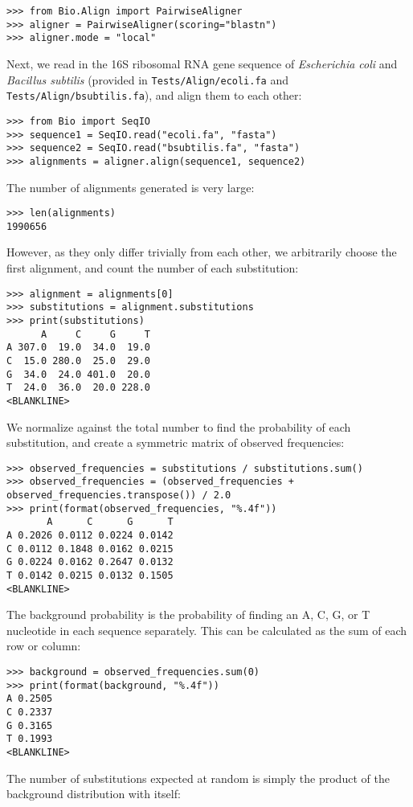 \begin{verbatim}
>>> from Bio.Align import PairwiseAligner
>>> aligner = PairwiseAligner(scoring="blastn")
>>> aligner.mode = "local"
\end{verbatim}
Next, we read in the 16S ribosomal RNA gene sequence of \textit{Escherichia coli} and \textit{Bacillus subtilis} (provided in \verb+Tests/Align/ecoli.fa+ and \verb+Tests/Align/bsubtilis.fa+), and align them to each other:

\begin{verbatim}
>>> from Bio import SeqIO
>>> sequence1 = SeqIO.read("ecoli.fa", "fasta")
>>> sequence2 = SeqIO.read("bsubtilis.fa", "fasta")
>>> alignments = aligner.align(sequence1, sequence2)
\end{verbatim}
The number of alignments generated is very large:

\begin{verbatim}
>>> len(alignments)
1990656
\end{verbatim}
However, as they only differ trivially from each other, we arbitrarily choose the first alignment, and count the number of each substitution:

\begin{verbatim}
>>> alignment = alignments[0]
>>> substitutions = alignment.substitutions
>>> print(substitutions)
      A     C     G     T
A 307.0  19.0  34.0  19.0
C  15.0 280.0  25.0  29.0
G  34.0  24.0 401.0  20.0
T  24.0  36.0  20.0 228.0
<BLANKLINE>
\end{verbatim}
We normalize against the total number to find the probability of each substitution, and create a symmetric matrix of observed frequencies:

\begin{verbatim}
>>> observed_frequencies = substitutions / substitutions.sum()
>>> observed_frequencies = (observed_frequencies + observed_frequencies.transpose()) / 2.0
>>> print(format(observed_frequencies, "%.4f"))
       A      C      G      T
A 0.2026 0.0112 0.0224 0.0142
C 0.0112 0.1848 0.0162 0.0215
G 0.0224 0.0162 0.2647 0.0132
T 0.0142 0.0215 0.0132 0.1505
<BLANKLINE>
\end{verbatim}
The background probability is the probability of finding an A, C, G, or T nucleotide in each sequence separately. This can be calculated as the sum of each row or column:

\begin{verbatim}
>>> background = observed_frequencies.sum(0)
>>> print(format(background, "%.4f"))
A 0.2505
C 0.2337
G 0.3165
T 0.1993
<BLANKLINE>
\end{verbatim}
The number of substitutions expected at random is simply the product of the background distribution with itself:

